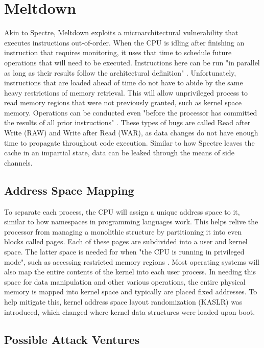 \documentclass[conference]{IEEEtran}
\begin{document}
\section{Meltdown}

Akin to Spectre, Meltdown exploits a microarchitectural vulnerability that executes instructions out-of-order.
When the CPU is idling after finishing an instruction that requires monitoring, it uses that time to schedule future operations that will need to be executed.
Instructions here can be run "in parallel as long as their results follow the architectural definition" \autocite[2]{MeltdownAnalysis}.
Unfortunately, instructions that are loaded ahead of time do not have to abide by the same heavy restrictions of memory retrieval.
This will allow unprivileged process to read memory regions that were not previously granted, such as kernel space memory.
Operations can be conducted even "before the processor has committed the results of all prior instructions" \autocite[3]{MeltdownAnalysis}.
These types of bugs are called Read after Write (RAW) and Write after Read (WAR), as data changes do not have enough time to propagate throughout code execution.
Similar to how Spectre leaves the cache in an impartial state, data can be leaked through the means of side channels.

\subsection{Address Space Mapping}

To separate each process, the CPU will assign a unique address space to it, similar to how namespaces in programming languages work.
This helps relive the processor from managing a monolithic structure by partitioning it into even blocks called pages.
Each of these pages are subdivided into a user and kernel space.
The latter space is needed for when "the CPU is running in privileged mode", such as accessing restricted memory regions \autocite[4]{MeltdownAnalysis}.
Most operating systems will also map the entire contents of the kernel into each user process.
In needing this space for data manipulation and other various operations, the entire physical memory is mapped into kernel space and typically are placed fixed addresses.
To help mitigate this, kernel address space layout randomization (KASLR) was introduced, which changed where kernel data structures were loaded upon boot.

\subsection{Possible Attack Ventures}
\end{document}
